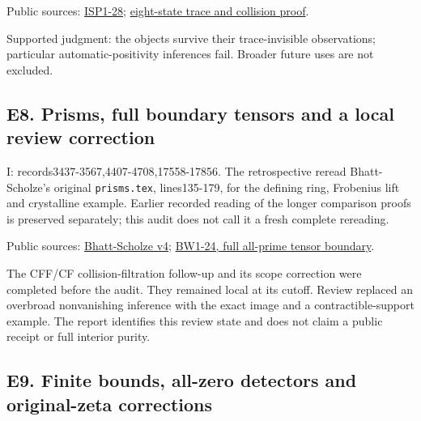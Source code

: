 \documentclass[
  british,
  11pt,
  a4paper,
]{article}
\begin{document}
Public sources:
\href{https://github.com/KokunoYumeto/zeta-function-research-reader/blob/173dbc6ed5a03235dbe7654f928f3692107db39b/workbenches/splitzero-tandem/branches/tau-zero-prime-positivity/INFINITESIMAL_SUPPORT_POSITIVITY_DERIVATION.md}{ISP1-28};
\href{https://github.com/KokunoYumeto/zeta-function-research-reader/blob/d5c9d198a8432e3ede468b280162a99c00e3f4f7/workbenches/splitzero-tandem/branches/tau-zero-prime-positivity/EIGHT_STATE_HEAT_COMPARISON.md}{eight-state
trace and collision proof}.

Supported judgment: the objects survive their trace-invisible
observations; particular automatic-positivity inferences fail. Broader
future uses are not excluded.

\subsection{E8. Prisms, full boundary tensors and a local review
correction}\label{e8.-prisms-full-boundary-tensors-and-a-local-review-correction}

I: records3437-3567,4407-4708,17558-17856. The retrospective reread
Bhatt-Scholze's original \texttt{prisms.tex}, lines135-179, for the
defining ring, Frobenius lift and crystalline example. Earlier recorded
reading of the longer comparison proofs is preserved separately; this
audit does not call it a fresh complete rereading.

Public sources: \href{https://arxiv.org/abs/1905.08229v4}{Bhatt-Scholze
v4};
\href{https://github.com/KokunoYumeto/zeta-function-research-reader/blob/e1dc06aa68bb810cf7d8b0006942f5b036b8b765/workbenches/splitzero-tandem/continuations/20260923-retained-source-readers/all-prime-boundary-weights/ROOT_BOUNDARY_WEIGHT_HOMOLOGY.tex}{BW1-24,
full all-prime tensor boundary}.

The CFF/CF collision-filtration follow-up and its scope correction were
completed before the audit. They remained local at its cutoff. Review
replaced an overbroad nonvanishing inference with the exact image and a
contractible-support example. The report identifies this review state
and does not claim a public receipt or full interior purity.

\subsection{E9. Finite bounds, all-zero detectors and original-zeta
corrections}\label{e9.-finite-bounds-all-zero-detectors-and-original-zeta-corrections}
\end{document}
